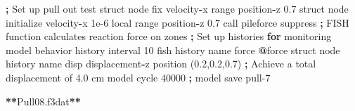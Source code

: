 \documentclass[a4paper, nobind]{templates/ociamthesis}
\newenvironment{Shaded}{\begin{snugshade}}{\end{snugshade}}
\newcommand{\BuiltInTok}[1]{#1}
\newcommand{\ControlFlowTok}[1]{\textcolor[rgb]{0.13,0.29,0.53}{\textbf{#1}}}
\newcommand{\DecValTok}[1]{\textcolor[rgb]{0.00,0.00,0.81}{#1}}
\newcommand{\FloatTok}[1]{\textcolor[rgb]{0.00,0.00,0.81}{#1}}
\newcommand{\NormalTok}[1]{#1}
\newcommand{\OperatorTok}[1]{\textcolor[rgb]{0.81,0.36,0.00}{\textbf{#1}}}
\newcommand{\StringTok}[1]{\textcolor[rgb]{0.31,0.60,0.02}{#1}}
\renewenvironment{Shaded}
{
  \vspace{10pt}%
  \begin{snugshade}%
}{%
  \end{snugshade}%
  \vspace{8pt}%
}
\begin{document}
\begin{Shaded}
\begin{Highlighting}[]
    \OperatorTok{;}\NormalTok{ Set up pull out test}
\NormalTok{    struct node fix velocity}\OperatorTok{{-}}\NormalTok{x }\BuiltInTok{range}\NormalTok{ position}\OperatorTok{{-}}\NormalTok{z }\FloatTok{0.7}
\NormalTok{    struct node initialize velocity}\OperatorTok{{-}}\NormalTok{x }\FloatTok{1e{-}6}\NormalTok{ local }\BuiltInTok{range}\NormalTok{ position}\OperatorTok{{-}}\NormalTok{z }\FloatTok{0.7}
\NormalTok{    call }\StringTok{\textquotesingle{}pileforce\textquotesingle{}}\NormalTok{ suppress }\OperatorTok{;}\NormalTok{ FISH function calculates reaction force on zones}
    \OperatorTok{;}\NormalTok{ Set up histories }\ControlFlowTok{for}\NormalTok{ monitoring model behavior}
\NormalTok{    history interval }\DecValTok{10}
\NormalTok{    fish history name }\StringTok{\textquotesingle{}force\textquotesingle{}} \OperatorTok{@}\NormalTok{force}
\NormalTok{    struct node history name }\StringTok{\textquotesingle{}disp\textquotesingle{}}\NormalTok{ displacement}\OperatorTok{{-}}\NormalTok{z position (}\FloatTok{0.2}\NormalTok{,}\FloatTok{0.2}\NormalTok{,}\FloatTok{0.7}\NormalTok{)}
    \OperatorTok{;}\NormalTok{ Achieve a total displacement of }\FloatTok{4.0}\NormalTok{ cm}
\NormalTok{    model cycle }\DecValTok{40000}
    \OperatorTok{;}
\NormalTok{    model save }\StringTok{\textquotesingle{}pull{-}7\textquotesingle{}}

\OperatorTok{**}\NormalTok{Pull08.f3dat}\OperatorTok{**}


\end{Highlighting}
\end{Shaded}
\end{document}
